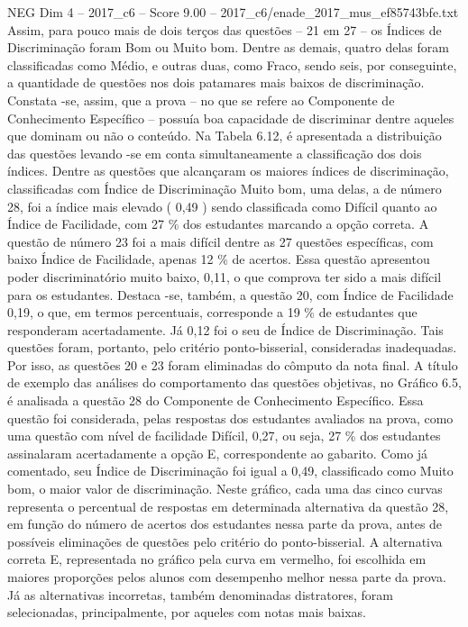 \begin{textsample}{NEG Dim 4 – 2017\_c6 – Score 9.00 – 2017\_c6/enade\_2017\_mus\_ef85743bfe.txt}
Assim, para pouco mais de dois terços das questões – 21 em 27 – os Índices de Discriminação foram Bom ou Muito bom.
Dentre as demais, quatro delas foram classificadas como Médio, e outras duas, como Fraco, sendo seis, por conseguinte, a quantidade de questões nos dois patamares mais baixos de discriminação.
Constata -se, assim, que a prova – no que se refere ao Componente de Conhecimento Específico – possuía boa capacidade de discriminar dentre aqueles que dominam ou não o conteúdo.
Na Tabela 6.12, é apresentada a distribuição das questões levando -se em conta simultaneamente a classificação dos dois índices.
Dentre as questões que alcançaram os maiores índices de discriminação, classificadas com Índice de Discriminação Muito bom, uma delas, a de número 28, foi a índice mais elevado ( 0,49 ) sendo classificada como Difícil quanto ao Índice de Facilidade, com 27 \% dos estudantes marcando a opção correta.
A questão de número 23 foi a mais difícil dentre as 27 questões específicas, com baixo Índice de Facilidade, apenas 12 \% de acertos.
Essa questão apresentou poder discriminatório muito baixo, 0,11, o que comprova ter sido a mais difícil para os estudantes.
Destaca -se, também, a questão 20, com Índice de Facilidade 0,19, o que, em termos percentuais, corresponde a 19 \% de estudantes que responderam acertadamente.
Já 0,12 foi o seu de Índice de Discriminação.
Tais questões foram, portanto, pelo critério ponto-bisserial, consideradas inadequadas.
Por isso, as questões 20 e 23 foram eliminadas do cômputo da nota final.
A título de exemplo das análises do comportamento das questões objetivas, no Gráfico 6.5, é analisada a questão 28 do Componente de Conhecimento Específico.
Essa questão foi considerada, pelas respostas dos estudantes avaliados na prova, como uma questão com nível de facilidade Difícil, 0,27, ou seja, 27 \% dos estudantes assinalaram acertadamente a opção E, correspondente ao gabarito.
Como já comentado, seu Índice de Discriminação foi igual a 0,49, classificado como Muito bom, o maior valor de discriminação.
Neste gráfico, cada uma das cinco curvas representa o percentual de respostas em determinada alternativa da questão 28, em função do número de acertos dos estudantes nessa parte da prova, antes de possíveis eliminações de questões pelo critério do ponto-bisserial.
A alternativa correta E, representada no gráfico pela curva em vermelho, foi escolhida em maiores proporções pelos alunos com desempenho melhor nessa parte da prova.
Já as alternativas incorretas, também denominadas distratores, foram selecionadas, principalmente, por aqueles com notas mais baixas.

\end{textsample}
